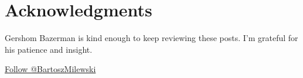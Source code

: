 \section{Acknowledgments}\label{acknowledgments}

Gershom Bazerman is kind enough to keep reviewing these posts. I'm
grateful for his patience and insight.


\href{https://twitter.com/BartoszMilewski}{Follow @BartoszMilewski}
